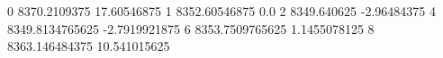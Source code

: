 0 8370.2109375 17.60546875
1 8352.60546875 0.0
2 8349.640625 -2.96484375
4 8349.8134765625 -2.7919921875
6 8353.7509765625 1.1455078125
8 8363.146484375 10.541015625

